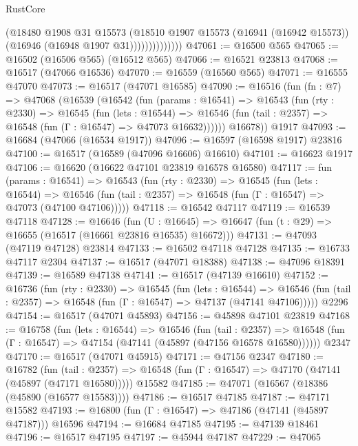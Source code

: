 \begin{lexlean}{RustCore}
\begin{coremodule}
                        (@18480
                          @1908
                          @31
                          @15573
                          (@18510
                            @1907
                            @15573
                            (@16941 (@16942 @15573))
                            (@16946 (@16948 @1907 @31))))))))))))))
@47061 := @16500 @565
@47065 := @16502 (@16506 @565) (@16512 @565)
@47066 := @16521 @23813
@47068 := @16517 (@47066 @16536)
@47070 := @16559 (@16560 @565)
@47071 := @16555 @47070
@47073 := @16517 (@47071 @16585)
@47090 := @16516
    (fun (fn : @7) =>
    @47068
      (@16539
        (@16542
          (fun (params : @16541) =>
          @16543
            (fun (rty : @2330) =>
            @16545
              (fun (lets : @16544) =>
              @16546 (fun (tail : @2357) => @16548 (fun (Γ : @16547) => @47073 @16632))))))
        @16678))
    @1917
@47093 := @16684 (@47066 (@16534 @1917))
@47096 := @16597 (@16598 @1917) @23816
@47100 := @16517 (@16589 (@47096 @16606) @16610)
@47101 := @16623 @1917
@47106 := @16620 (@16622 @47101 @23819 @16578 @16580)
@47117 := fun (params : @16541) =>
  @16543
    (fun (rty : @2330) =>
    @16545
      (fun (lets : @16544) =>
      @16546 (fun (tail : @2357) => @16548 (fun (Γ : @16547) => @47073 (@47100 @47106)))))
@47118 := @16542 @47117
@47119 := @16539 @47118
@47128 := @16646
    (fun (U : @16645) => @16647 (fun (t : @29) => @16655 (@16517 (@16661 @23816 @16535) @16672)))
@47131 := @47093 (@47119 @47128) @23814
@47133 := @16502 @47118 @47128
@47135 := @16733 @47117 @2304
@47137 := @16517 (@47071 @18388)
@47138 := @47096 @18391
@47139 := @16589 @47138
@47141 := @16517 (@47139 @16610)
@47152 := @16736
    (fun (rty : @2330) =>
    @16545
      (fun (lets : @16544) =>
      @16546 (fun (tail : @2357) => @16548 (fun (Γ : @16547) => @47137 (@47141 @47106)))))
    @2296
@47154 := @16517 (@47071 @45893)
@47156 := @45898 @47101 @23819
@47168 := @16758
    (fun (lets : @16544) =>
    @16546
      (fun (tail : @2357) =>
      @16548 (fun (Γ : @16547) => @47154 (@47141 (@45897 (@47156 @16578 @16580))))))
    @2347
@47170 := @16517 (@47071 @45915)
@47171 := @47156 @2347
@47180 := @16782
    (fun (tail : @2357) => @16548 (fun (Γ : @16547) => @47170 (@47141 (@45897 (@47171 @16580)))))
    @15582
@47185 := @47071 (@16567 (@18386 (@45890 (@16577 @15583))))
@47186 := @16517 @47185
@47187 := @47171 @15582
@47193 := @16800 (fun (Γ : @16547) => @47186 (@47141 (@45897 @47187))) @16596
@47194 := @16684 @47185
@47195 := @47139 @18461
@47196 := @16517 @47195
@47197 := @45944 @47187
@47229 := @47065

\end{coremodule}
\end{lexlean}
